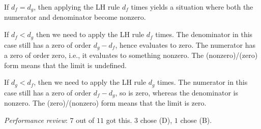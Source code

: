 \documentclass[10pt]{amsart}
\begin{document}
\begin{enumerate}
  If $d_f = d_g$, then applying the LH rule $d_f$ times yields a
  situation where both the numerator and denominator become nonzero.

  If $d_f < d_g$ then we need to apply the LH rule $d_f$ times. The
  denominator in this case still has a zero of order $d_g - d_f$,
  hence evaluates to zero. The numerator has a zero of order zero,
  i.e., it evaluates to something nonzero. The (nonzero)/(zero) form means that the limit is undefined.

  If $d_g < d_f$, then we need to apply the LH rule $d_g$ times. The
  numerator in this case still has a zero of order $d_f - d_g$, so is
  zero, whereas the denominator is nonzero. The (zero)/(nonzero) form
  means that the limit is zero.

  {\em Performance review}: $7$ out of $11$ got this. $3$ chose (D),
  $1$ chose (B).
\end{enumerate}
\end{document}
